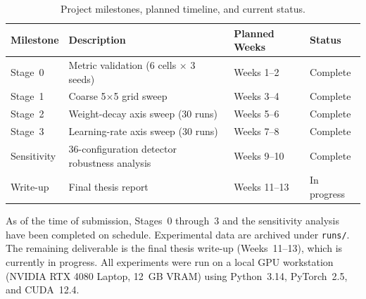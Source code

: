 \documentclass[12pt,openany,a4paper]{book}
\begin{document}
\begin{table}[htbp]
  \centering
  \caption{Project milestones, planned timeline, and current status.}
  \label{tab:milestones}
  \renewcommand{\arraystretch}{1.2}
  \begin{tabular}{llll}
    \toprule
    Milestone & Description & Planned Weeks & Status \\
    \midrule
    Stage~0 & Metric validation (6 cells $\times$ 3 seeds) & Weeks 1--2 & Complete \\
    Stage~1 & Coarse 5$\times$5 grid sweep & Weeks 3--4 & Complete \\
    Stage~2 & Weight-decay axis sweep (30 runs) & Weeks 5--6 & Complete \\
    Stage~3 & Learning-rate axis sweep (30 runs) & Weeks 7--8 & Complete \\
    Sensitivity & 36-configuration detector robustness analysis & Weeks 9--10 & Complete \\
    Write-up  & Final thesis report & Weeks 11--13 & In progress \\
    \bottomrule
  \end{tabular}
\end{table}

As of the time of submission, Stages~0 through~3 and the sensitivity
analysis have been completed on schedule.
Experimental data are archived under \texttt{runs/}.
The remaining deliverable is the final thesis write-up (Weeks~11--13),
which is currently in progress.
All experiments were run on a local GPU workstation
(NVIDIA RTX 4080 Laptop, 12~GB VRAM) using
Python~3.14, PyTorch~2.5, and CUDA~12.4.
\end{document}
